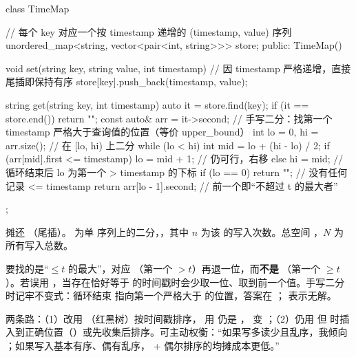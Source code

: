 \begin{cpp}
class TimeMap {
    // 每个 key 对应一个按 timestamp 递增的 (timestamp, value) 序列
    unordered_map<string, vector<pair<int, string>>> store;
public:
    TimeMap() {}

    void set(string key, string value, int timestamp) {
        // 因 timestamp 严格递增，直接尾插即保持有序
        store[key].push_back({timestamp, value});
    }

    string get(string key, int timestamp) {
        auto it = store.find(key);
        if (it == store.end()) return "";
        const auto& arr = it->second;
        // 手写二分：找第一个 timestamp 严格大于查询值的位置（等价 upper_bound）
        int lo = 0, hi = arr.size();      // 在 [lo, hi) 上二分
        while (lo < hi) {
            int mid = lo + (hi - lo) / 2;
            if (arr[mid].first <= timestamp) lo = mid + 1; // 仍可行，右移
            else hi = mid;
        }
        // 循环结束后 lo 为第一个 > timestamp 的下标
        if (lo == 0) return "";           // 没有任何记录 <= timestamp
        return arr[lo - 1].second;        // 前一个即“不超过 t 的最大者”
    }
};
\end{cpp}

\begin{keypoint}[复杂度]
 摊还 （尾插）。 为单  序列上的二分，，其中 $n$ 为该  的写入次数。总空间 ，$N$ 为所有写入总数。
\end{keypoint}

\begin{pitfall}
要找的是“$\le t$ 的最大”，对应 （第一个 $> t$）再退一位，而\textbf{不是} （第一个 $\ge t$）。若误用 ，当存在恰好等于  的时间戳时会少取一位、取到前一个值。手写二分时记牢不变式：循环结束  指向第一个严格大于  的位置，答案在 ； 表示无解。
\end{pitfall}

\begin{followup}
两条路：（1）改用 （红黑树）按时间戳排序， 用  仍是 ， 变 ；（2）仍用  但  时插入到正确位置（）或先收集后排序。可主动权衡：“如果写多读少且乱序，我倾向 ；如果写入基本有序、偶有乱序， + 偶尔排序的均摊成本更低。”
\end{followup}

